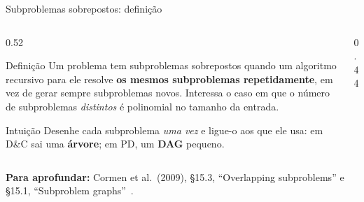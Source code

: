 \documentclass[aspectratio=169,xcolor=table]{beamer}
\newcommand{\fonte}[1]{%
  \vfill
  {\tiny\color{gray!55!black}\textbf{Para aprofundar:} #1\par}%
}
\begin{document}
\begin{frame}{Subproblemas sobrepostos: definição}
  \begin{columns}[c]
    \begin{column}{0.52\textwidth}
      \begin{block}{Definição}
        \scriptsize Um problema tem \alert{subproblemas sobrepostos} quando um algoritmo
        recursivo para ele resolve \textbf{os mesmos subproblemas repetidamente}, em vez de
        gerar sempre subproblemas novos. Interessa o caso em que o número de subproblemas
        \emph{distintos} é polinomial no tamanho da entrada.
      \end{block}
      \begin{exampleblock}{Intuição}
        \scriptsize Desenhe cada subproblema \emph{uma vez} e ligue-o aos que ele usa: em
        D\&C sai uma \textbf{árvore}; em PD, um \textbf{DAG} pequeno.
      \end{exampleblock}
    \end{column}
    \begin{column}{0.44\textwidth}
      \centering
    \end{column}
  \end{columns}
  \fonte{Cormen et al.\ (2009), \S 15.3, ``Overlapping subproblems'' e \S 15.1, ``Subproblem
    graphs''~\cite{cormen2009introduction}.}
\end{frame}
\end{document}
